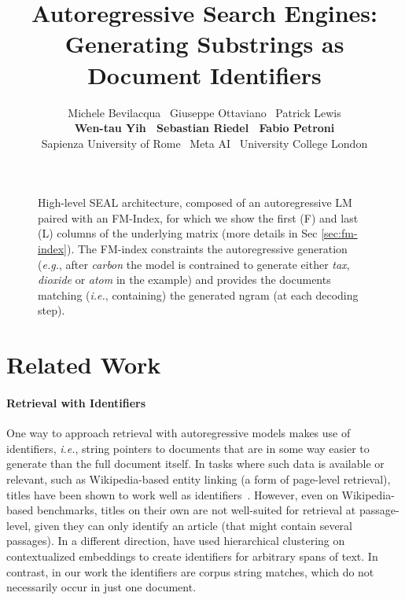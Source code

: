 \documentclass[11pt]{article}
\title{Autoregressive Search Engines:\\ Generating Substrings as Document Identifiers}
\author{
Michele Bevilacqua\sapienzafair{} \
Giuseppe Ottaviano\fair{} \
Patrick Lewis\fair{} \\
{\bf Wen-tau Yih\fair{} \ Sebastian Riedel\uclfair{} \ Fabio Petroni\fair{} } \\ 
\sapienza{}Sapienza University of Rome \ \fair{}Meta AI \ \ucl{}University College London}
\newcommand{\eg}{\textit{e.g.}}
\newcommand{\ie}{\textit{i.e.}}
\begin{document}
\maketitle
\begin{abstract}

\end{abstract}

\begin{figure}[ht!]
    \centering
    \caption{
    High-level SEAL architecture, composed of an autoregressive LM paired with an FM-Index, for which we show the first (F) and last (L) columns of the underlying matrix (more details in Sec \ref{sec:fm-index}). The FM-index constraints the autoregressive generation (\eg, after \textit{carbon} the model is contrained to generate either \textit{tax}, \textit{dioxide} or \textit{atom} in the example) and provides the documents matching (\ie, containing) the generated ngram (at each decoding step).
    }
    \label{fig:main}
\end{figure}



\section{Related Work}

\paragraph{Retrieval with Identifiers} One way to approach retrieval with autoregressive models makes use of identifiers, \ie, string pointers to documents that are in some way easier to generate than the full document itself. In tasks where such data is available or relevant, such as Wikipedia-based entity linking (a form of page-level retrieval), titles have been shown to work well as identifiers~\citep{decao-etal-2021-autoregressive,de-cao-etal-2021-highly,de2022multilingual}. However, even on Wikipedia-based benchmarks, titles on their own are not well-suited for retrieval at passage-level, given they can only identify an article (that might contain several passages). In a different direction, \citet{tay-etal-2021-measuring} have used hierarchical clustering on contextualized embeddings to create identifiers for arbitrary spans of text. In contrast, in our work the identifiers are corpus string matches, which do not necessarily occur in just one document.
\end{document}
